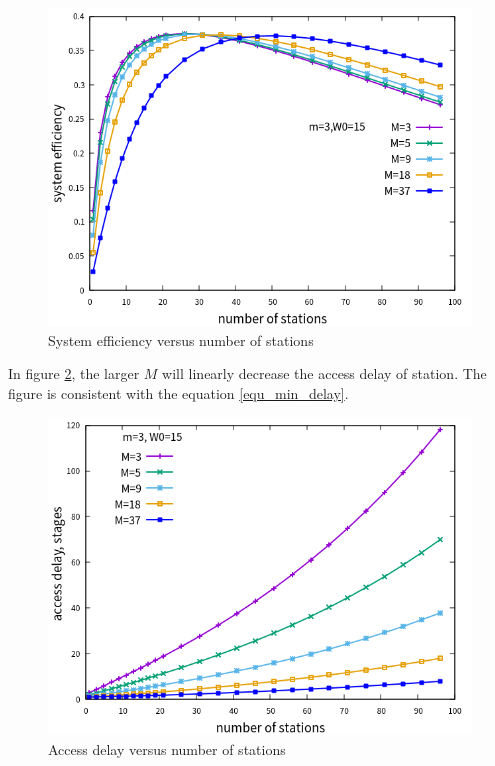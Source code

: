 \begin{figure}[!ht]
\includegraphics[scale=.54]{./figure/n_M_eff_perf.png}
\caption{System efficiency versus number of stations}
\label{fig_n_M_eff}
\end{figure}

In figure \ref{fig_n_M_delay}, the larger $M$ will linearly decrease the access delay of station. The figure is consistent with the equation \ref{equ_min_delay}. 

\begin{figure}[!ht]
\includegraphics[scale=.54]{./figure/n_M_delay_perf.png}
\caption{Access delay versus number of stations}
\label{fig_n_M_delay}
\end{figure}

